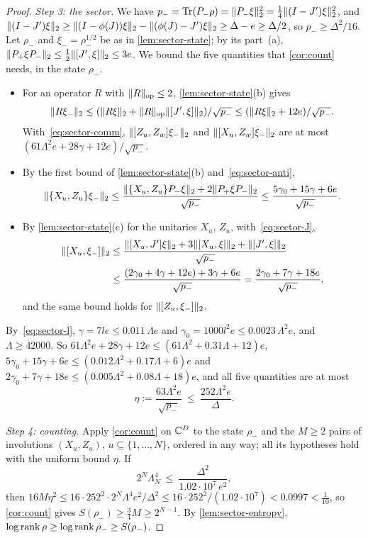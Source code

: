 \begin{proof}
\emph{Step 3: the sector.} We have $p_-=\operatorname{Tr}(P_-\rho)=\lVert P_-\xi\rVert_2^2=\frac14\lVert (I-J')\xi\rVert_2^2$, and
$\lVert (I-J')\xi\rVert_2\ge\lVert (I-\phi(J))\xi\rVert_2-\lVert (\phi(J)-J')\xi\rVert_2\ge\Delta-e\ge\Delta/2$, so $p_-\ge\Delta^2/16$. Let $\rho_-$ and
$\xi_-=\rho_-^{1/2}$ be as in \cref{lem:sector-state}; by its part~(a), $\lVert P_+\xi P_-\rVert_2\le\frac12\lVert [J',\xi]\rVert_2\le3e$. We bound the five
quantities that \cref{cor:count} needs, in the state $\rho_-$.
\begin{itemize}[itemsep=1pt]
\item For an operator $R$ with $\lVert R\rVert_{\mathrm{op}}\le2$, \cref{lem:sector-state}(b) gives
\[
\lVert R\xi_-\rVert_2\le(\lVert R\xi\rVert_2+\lVert R\rVert_{\mathrm{op}}\lVert [J',\xi]\rVert_2)/\sqrt{p_-}\le(\lVert R\xi\rVert_2+12e)/\sqrt{p_-}.
\]
With~\eqref{eq:sector-comm}, $\lVert [Z_u,Z_w]\xi_-\rVert_2$ and $\lVert [X_u,Z_w]\xi_-\rVert_2$ are at most $(61\Lambda^2e+28\gamma+12e)/\sqrt{p_-}$.
\item By the first bound of \cref{lem:sector-state}(b) and~\eqref{eq:sector-anti},
\[
\lVert \{X_u,Z_u\}\xi_-\rVert_2\le\frac{\lVert \{X_u,Z_u\}P_-\xi\rVert_2+2\lVert P_+\xi P_-\rVert_2}{\sqrt{p_-}}\le\frac{5\gamma_0+15\gamma+6e}{\sqrt{p_-}}.
\]
\item By \cref{lem:sector-state}(c) for the unitaries $X_u$, $Z_u$, with~\eqref{eq:sector-J},
\begin{align*}
\lVert [X_u,\xi_-]\rVert_2&\le\frac{\lVert [X_u,J']\xi\rVert_2+3\lVert [X_u,\xi]\rVert_2+\lVert [J',\xi]\rVert_2}{\sqrt{p_-}}\\
&\le\frac{(2\gamma_0+4\gamma+12e)+3\gamma+6e}{\sqrt{p_-}}=\frac{2\gamma_0+7\gamma+18e}{\sqrt{p_-}},
\end{align*}
and the same bound holds for $\lVert [Z_u,\xi_-]\rVert_2$.
\end{itemize}
By~\eqref{eq:sector-l}, $\gamma=7le\le0.011\,\Lambda e$ and $\gamma_0=1000l^2e\le0.0023\,\Lambda^2e$, and $\Lambda\ge42000$. So
$61\Lambda^2e+28\gamma+12e\le(61\Lambda^2+0.31\Lambda+12)e$, $5\gamma_0+15\gamma+6e\le(0.012\Lambda^2+0.17\Lambda+6)e$ and
$2\gamma_0+7\gamma+18e\le(0.005\Lambda^2+0.08\Lambda+18)e$, and all five quantities are at most
\[
\eta:=\frac{63\Lambda^2e}{\sqrt{p_-}}\ \le\ \frac{252\Lambda^2e}{\Delta}.
\]

\emph{Step 4: counting.} Apply \cref{cor:count} on $\mathbb C^D$ to the state $\rho_-$ and the $M\ge2$ pairs of involutions $(X_u,Z_u)$,
$u\subseteq\{1,\dots,N\}$, ordered in any way; all its hypotheses hold with the uniform bound $\eta$. If
\begin{equation}\label{eq:sector-N}
2^N\Lambda_N^4\ \le\ \frac{\Delta^2}{1.02\cdot10^7\,e^2},
\end{equation}
then $16M\eta^2\le16\cdot252^2\cdot2^N\Lambda^4e^2/\Delta^2\le16\cdot252^2/(1.02\cdot10^7)<0.0997<\frac1{10}$, so \cref{cor:count} gives
$S(\rho_-)\ge\frac34M\ge2^{N-1}$. By \cref{lem:sector-entropy}, $\log\operatorname{rank}\rho\ge\log\operatorname{rank}\rho_-\ge S(\rho_-)$.


\end{proof}
